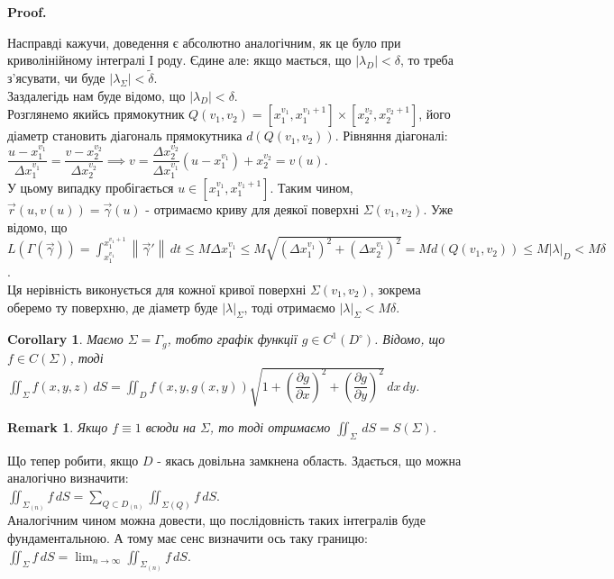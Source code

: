 \documentclass[a4paper, 10pt]{article}
\makeatletter
\def\departial#1#2{\dfrac{\partial {#1}}{\partial {#2}}}
\def\qed{$\blacksquare$}
\theoremstyle{theoremdd}
\theoremstyle{theoremdd}
\theoremstyle{theoremdd}
\theoremstyle{theoremdd}
\theoremstyle{theoremdd}
\theoremstyle{theoremdd}
\theoremstyle{theoremdd}
\theoremstyle{theoremdd}
\theoremstyle{theoremdd}
\theoremstyle{theoremdd}
\theoremstyle{theoremdd}
\newtheorem{remark}[theorem]{Remark}
\theoremstyle{theoremdd}
\theoremstyle{theoremdd}
\theoremstyle{theoremdd}
\newtheorem{corollary}[theorem]{Corollary}
\theoremstyle{theoremdd}
\renewenvironment{proof}[1][Proof.\\]{\par
\pushQED{\hfill \qed}%
\normalfont \topsep6\p@\@plus6\p@\relax
\trivlist
\item\relax
{\bfseries
#1\@addpunct{.}}\hspace\labelsep\ignorespaces
}{%
\popQED\endtrivlist\@endpefalse
}
\newcommand\Norm[1]{\left\lVert#1\right\rVert}
\makeatother
\begin{document}
\begin{proof}
Насправді кажучи, доведення є абсолютно аналогічним, як це було при криволінійному інтегралі І роду. Єдине але: якщо мається, що $|\lambda_D| < \delta$, то треба з'ясувати, чи буде $|\lambda_\Sigma| < \tilde{\delta}$.\\
Заздалегідь нам буде відомо, що $|\lambda_D| < \delta$.\\
Розглянемо якийсь прямокутник $Q(v_1,v_2) = \left[ x_1^{v_1}, x_1^{v_1+1} \right] \times \left[ x_2^{v_2}, x_2^{v_2+1} \right]$, його діаметр становить діагональ прямокутника $d(Q(v_1,v_2))$. Рівняння діагоналі:\\
$\dfrac{u-x_1^{v_1}}{\Delta x_1^{v_1}} = \dfrac{v - x_2^{v_2}}{\Delta x_2^{v_2}} \implies v = \dfrac{\Delta x_2^{v_2}}{\Delta x_1^{v_1}} (u-x_1^{v_1}) + x_2^{v_2} = v(u)$.\\
У цьому випадку пробігається $u \in [x_1^{v_1}, x_1^{v_1+1}]$. Таким чином, $\vec{r}(u,v(u)) = \vec{\gamma}(u)$ - отримаємо криву для деякої поверхні $\Sigma(v_1,v_2)$. Уже відомо, що\\
$L(\Gamma(\vec{\gamma})) = \displaystyle\int_{x_{1}^{v_1}}^{x_1^{v_1+1}} \Norm{ \vec{\gamma}' }\,dt \leq M \Delta x_1^{v_1} \leq M \sqrt{(\Delta x_1^{v_1})^2+(\Delta x_2^{v_1})^2} = M d(Q(v_1,v_2)) \leq M |\lambda|_D < M\delta$.\\
Ця нерівність виконується для кожної кривої поверхні $\Sigma(v_1,v_2)$, зокрема оберемо ту поверхню, де діаметр буде $|\lambda|_{\Sigma}$, тоді отримаємо $|\lambda|_{\Sigma} < M\delta$.
\end{proof}

\begin{corollary}
Маємо $\Sigma = \Gamma_g$, тобто графік функції $g \in C^1(D^\circ)$. Відомо, що $f \in C(\Sigma)$, тоді\\
$\displaystyle\iint_\Sigma f(x,y,z)\,dS = \iint_D f(x,y,g(x,y)) \sqrt{1+\left(\departial{g}{x}\right)^2 + \left(\departial{g}{y}\right)^2}\,dx\,dy$.
\end{corollary}

\begin{remark}
Якщо $f \equiv 1$ всюди на $\Sigma$, то тоді отримаємо $\displaystyle\iint_\Sigma \,dS = S(\Sigma)$.
\end{remark}

Що тепер робити, якщо $D$ - якась довільна замкнена область. Здається, що можна аналогічно визначити:\\
$\displaystyle\iint_{\Sigma_{(n)}} f\,dS = \sum_{Q \subset D_{(n)}} \iint_{\Sigma(Q)} f\,dS$.\\
Аналогічним чином можна довести, що послідовність таких інтегралів буде фундаментальною. А тому має сенс визначити ось таку границю:\\
$\displaystyle\iint_{\Sigma} f\,dS = \lim_{n \to \infty} \iint_{\Sigma_{(n)}} f\,dS$.
\end{document}

